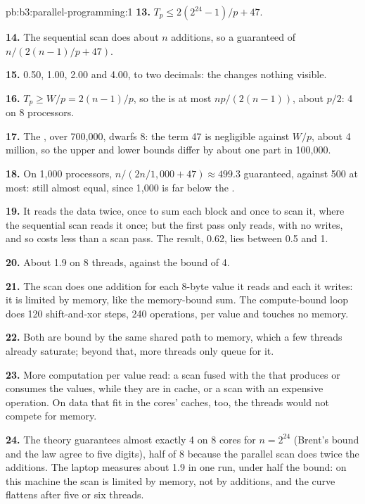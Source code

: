 \begin{solution}{pb:b3:parallel-programming:1}
\textbf{13.} $T_p \le 2(2^{24} - 1)/p + 47$.

\textbf{14.} The sequential scan does about $n$ additions, so a guaranteed  of $n / (2(n - 1)/p + 47)$.

\textbf{15.} 0.50, 1.00, 2.00 and 4.00, to two decimals: the  changes nothing visible.

\textbf{16.} $T_p \ge W/p = 2(n - 1)/p$, so the  is at most $np/(2(n - 1))$, about $p/2$: 4 on 8 processors.

\textbf{17.} The , over 700,000, dwarfs 8: the  term 47 is negligible against $W/p$, about 4 million, so the upper and lower bounds differ by about one part in 100,000.

\textbf{18.} On 1,000 processors, $n/(2n/1{,}000 + 47) \approx 499.3$ guaranteed, against 500 at most: still almost equal, since 1,000 is far below the .

\textbf{19.} It reads the data twice, once to sum each block and once to scan it, where the sequential scan reads it once; but the first pass only reads, with no writes, and so costs less than a scan pass. The result, 0.62, lies between 0.5 and 1.

\textbf{20.} About 1.9 on 8 threads, against the bound of 4.

\textbf{21.} The scan does one addition for each 8-byte value it reads and each it writes: it is limited by memory, like the memory-bound sum. The compute-bound loop does 120 shift-and-xor steps, 240 operations, per value and touches no memory.

\textbf{22.} Both are bound by the same shared path to memory, which a few threads already saturate; beyond that, more threads only queue for it.

\textbf{23.} More computation per value read: a scan fused with the  that produces or consumes the values, while they are in cache, or a scan with an expensive operation. On data that fit in the cores' caches, too, the threads would not compete for memory.

\textbf{24.} The theory guarantees almost exactly 4 on 8 cores for $n = 2^{24}$ (Brent's bound and the  law agree to five digits), half of 8 because the parallel scan does twice the additions. The laptop measures about 1.9 in one run, under half the bound: on this machine the scan is limited by memory, not by additions, and the curve flattens after five or six threads.
\end{solution}
